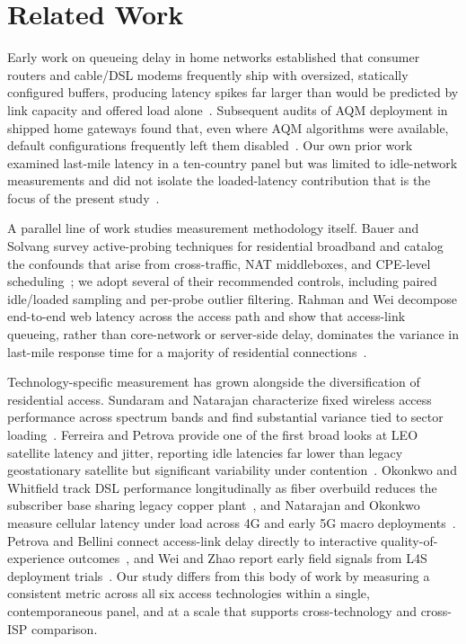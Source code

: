 \section{Related Work}
\label{sec:related}
Early work on queueing delay in home networks established that consumer routers and
cable/DSL modems frequently ship with oversized, statically configured buffers, producing
latency spikes far larger than would be predicted by link capacity and offered load
alone~\cite{whitfield2017bufferbloat}. Subsequent audits of AQM deployment in shipped home
gateways found that, even where AQM algorithms were available, default configurations
frequently left them disabled~\cite{bellini2016aqm}. Our own prior work examined last-mile
latency in a ten-country panel but was limited to idle-network measurements and did not
isolate the loaded-latency contribution that is the focus of the present
study~\cite{marchetti2019lastmile}.

A parallel line of work studies measurement methodology itself.
Bauer and Solvang survey active-probing techniques for residential broadband and catalog
the confounds that arise from cross-traffic, NAT middleboxes, and CPE-level
scheduling~\cite{bauer2015probing}; we adopt several of their recommended controls,
including paired idle/loaded sampling and per-probe outlier filtering. Rahman and Wei
decompose end-to-end web latency across the access path and show that access-link
queueing, rather than core-network or server-side delay, dominates the variance in
last-mile response time for a majority of residential connections~\cite{rahman2018cdn}.

Technology-specific measurement has grown alongside the diversification of residential
access. Sundaram and Natarajan characterize fixed wireless access performance across
spectrum bands and find substantial variance tied to sector loading~\cite{sundaram2020fwa}.
Ferreira and Petrova provide one of the first broad looks at LEO satellite latency and
jitter, reporting idle latencies far lower than legacy geostationary satellite but
significant variability under contention~\cite{ferreira2021satellite}. Okonkwo and
Whitfield track DSL performance longitudinally as fiber overbuild reduces the subscriber
base sharing legacy copper plant~\cite{okonkwo2021dsl}, and Natarajan and Okonkwo measure
cellular latency under load across 4G and early 5G macro deployments~\cite{natarajan2019mobile}.
Petrova and Bellini connect access-link delay directly to interactive quality-of-experience
outcomes~\cite{petrova2018qoe}, and Wei and Zhao report early field signals from L4S
deployment trials~\cite{wei2022l4s}. Our study differs from this body of work by measuring
a consistent metric across all six access technologies within a single, contemporaneous
panel, and at a scale that supports cross-technology and cross-ISP comparison.
